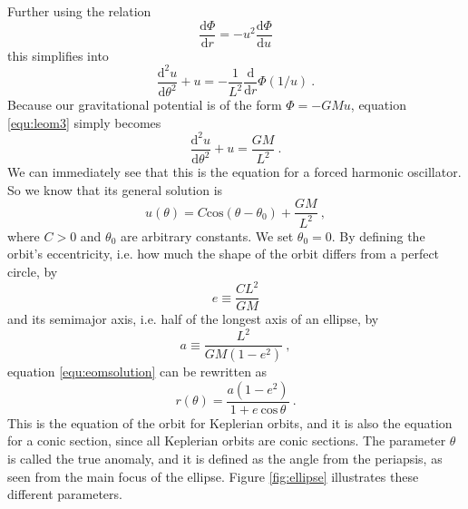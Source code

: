 \documentclass[english, oneside]{HYgradu}
\begin{document}
Further using the relation
\begin{equation}
\frac{\mathrm{d} \Phi}{\mathrm{d} r} = -u^2 \frac{\mathrm{d} \Phi}{\mathrm{d} u}
\end{equation}
this simplifies into
\begin{equation}
\frac{\mathrm{d}^2 u}{\mathrm{d} \theta^2} + u = -\frac{1}{L^2} \frac{\mathrm{d}}{\mathrm{d} r} \Phi (1/u) \label{equ:leom3} \ .
\end{equation}
Because our gravitational potential is of the form $\Phi = -GMu$, equation \ref{equ:leom3} simply becomes
\begin{equation}
\frac{\mathrm{d}^2 u}{\mathrm{d} \theta^2} + u = \frac{GM}{L^2} \ .
\end{equation}
We can immediately see that this is the equation for a forced harmonic oscillator. So we know that its general solution is
\begin{equation}
u(\theta) = C \mathrm{cos}(\theta - \theta_0) + \frac{GM}{L^2} \label{equ:eomsolution} \ ,
\end{equation}
where $C > 0$ and $\theta_0$ are arbitrary constants. We set $\theta_0 = 0$. By defining the orbit's eccentricity, i.e. how much the shape of the orbit differs from a perfect circle, by 
\begin{equation}
e \equiv \frac{CL^2}{GM}
\end{equation}
and its semimajor axis, i.e. half of the longest axis of an ellipse, by
\begin{equation}
a \equiv \frac{L^2}{GM(1-e^2)} \ ,
\end{equation}
equation \ref{equ:eomsolution} can be rewritten as 
\begin{equation}
r(\theta) = \frac{a (1-e^2)}{1 + e \ \mathrm{cos} \, \theta} \ .
\end{equation}
This is the equation of the orbit for Keplerian orbits, and it is also the equation for a conic section, since all Keplerian orbits are conic sections. The parameter $\theta$ is called the true anomaly, and it is defined as the angle from the periapsis, as seen from the main focus of the ellipse. Figure \ref{fig:ellipse} illustrates these different parameters.
\end{document}
